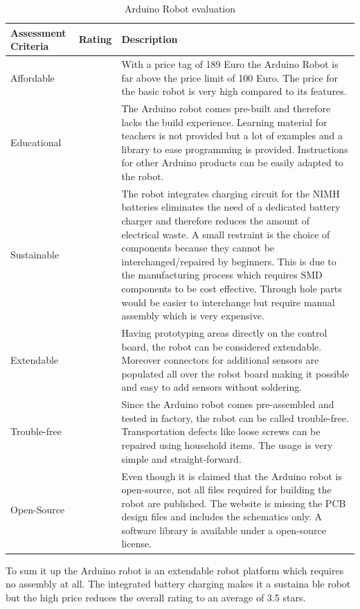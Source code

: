 \documentclass[11pt,a4paper]{article}
\newcounter{starnumber}
\newcommand{\stars}[1]{
  \forloop{starnumber}{1}{\value{starnumber} < 6}{
    \ifthenelse{#1 < \value{starnumber}}{\ding{73}}{\ding{72}}%
  }
}
\begin{document}
\begin{table}[h!]
\centering
\begin{tabular}{p{}p{}p{}}
\toprule
Assessment Criteria    & Rating & Description \\
\midrule
Affordable      & \stars{2}    & With a price tag of 189 Euro the Arduino Robot is far above the price limit of 100 Euro. The price for the basic robot is very high compared to its features.\\
Educational     & \stars{3}     & The Arduino robot comes pre-built and therefore lacks the build experience. Learning material for teachers is not provided but a lot of examples and a library to ease programming is provided. Instructions for other Arduino products can be easily adapted to the robot. \\
Sustainable       & \stars{4}     &  The robot integrates charging circuit for the NIMH batteries eliminates the need of a dedicated battery charger and therefore reduces the amount of electrical waste. A small restraint is the choice of components because they cannot be interchanged/repaired by beginners. This is due to the manufacturing process which requires SMD components to be cost effective. Through hole parts would be easier to interchange but require manual assembly which is very expensive.\\
Extendable & \stars{5}      &  Having prototyping areas directly on the control board, the robot can be considered extendable. Moreover connectors for additional sensors are populated all over the robot board making it possible and easy to add sensors without soldering.\\
Trouble-free & \stars{4} & Since the Arduino robot comes pre-assembled and tested in factory, the robot can be called trouble-free. Transportation defects like loose screws can be repaired using household items. The usage is very simple and straight-forward.\\
Open-Source & \stars{3} & Even though it is claimed that the Arduino robot is open-source, not all files required for building the robot are published. The website is missing the PCB design files and includes the schematics only. A software library is available under a open-source license. \\
\bottomrule
\end{tabular}
\caption{Arduino Robot evaluation}
\label{tbl:arduinorobot_eval}
\end{table}

To sum it up the Arduino robot is an extendable robot platform which requires no assembly at all. The integrated battery charging makes it a sustaina ble robot but the high price reduces the overall rating to an average of 3.5 stars.
\end{document}
